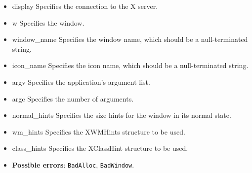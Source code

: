 \documentclass{report}
\begin{document}
\begin{itemize}
            \begin{itemize}
                \item display Specifies the connection to the X server.
                \item w Specifies the window.
                \item window\_name Specifies the window name, which should be a null-terminated string.
                \item icon\_name Specifies the icon name, which should be a null-terminated string.
                \item argv Specifies the application’s argument list.
                \item argc Specifies the number of arguments.
                \item normal\_hints Specifies the size hints for the window in its normal state.
                \item wm\_hints Specifies the XWMHints structure to be used.
                \item class\_hints Specifies the XClassHint structure to be used.
            \end{itemize}

            \begin{itemize}
                \item \textbf{Possible errors}: \texttt{BadAlloc}, \texttt{BadWindow}.
            \end{itemize}


    \end{itemize}
\end{document}
